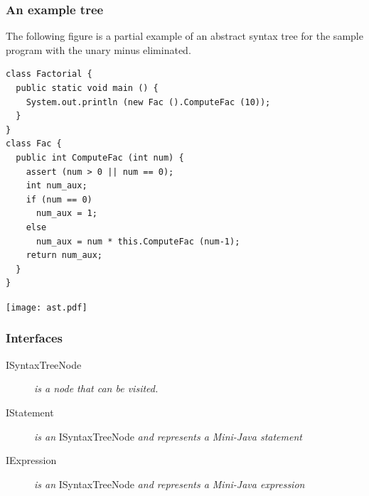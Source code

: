 \documentclass[a4paper,11pt]{article}
\begin{document}
\subsubsection{An example tree}

The following figure is a partial example of an abstract syntax tree for the sample program with the unary minus eliminated.

\begin{verbatim}
class Factorial {
  public static void main () {
    System.out.println (new Fac ().ComputeFac (10));
  }
}
class Fac {
  public int ComputeFac (int num) {
    assert (num > 0 || num == 0);
    int num_aux;
    if (num == 0)
      num_aux = 1;
    else 
      num_aux = num * this.ComputeFac (num-1);
    return num_aux;
  }
}
\end{verbatim}

\texttt{[image: ast.pdf]}

\subsubsection{Interfaces}
\begin{description}
\item[ISyntaxTreeNode] \emph{is a node that can be visited.}
\item[IStatement] \emph{is an} ISyntaxTreeNode \emph{and represents a Mini-Java statement}
\item[IExpression] \emph{is an} ISyntaxTreeNode \emph{and represents a Mini-Java expression}
\end{description}
\end{document}
